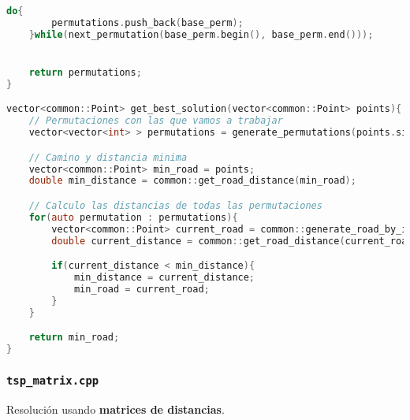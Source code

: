 \documentclass[10pt, a4paper]{article}
\theoremstyle{theorem-style}
\theoremstyle{theorem-style}
\theoremstyle{definition-style}
\theoremstyle{remark-style}
\theoremstyle{example-style}
\theoremstyle{definition-style}
\theoremstyle{remark-style}
\begin{document}
\begin{lstlisting}[language=C]
    do{
        permutations.push_back(base_perm);
    }while(next_permutation(base_perm.begin(), base_perm.end()));


    return permutations;
}

vector<common::Point> get_best_solution(vector<common::Point> points){
    // Permutaciones con las que vamos a trabajar
    vector<vector<int> > permutations = generate_permutations(points.size());

    // Camino y distancia minima
    vector<common::Point> min_road = points;
    double min_distance = common::get_road_distance(min_road);

    // Calculo las distancias de todas las permutaciones
    for(auto permutation : permutations){
        vector<common::Point> current_road = common::generate_road_by_indexes(points, permutation);
        double current_distance = common::get_road_distance(current_road);

        if(current_distance < min_distance){
            min_distance = current_distance;
            min_road = current_road;
        }
    }

    return min_road;
}
\end{lstlisting}

\subsubsection*{\texttt{tsp\_matrix.cpp}}

Resolución usando \textbf{matrices de distancias}.
\end{document}
